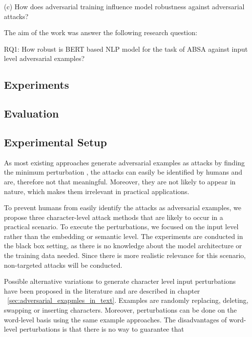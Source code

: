 (c) How does adversarial training influence model robustness against adversarial attacks?

The aim of the work was answer the following research question:

RQ1: How robust is BERT based NLP model for the task of ABSA against input level adversarial examples?



\subsection{Experiments}
\subsection{Evaluation}





\subsection{Experimental Setup} 


As most existing approaches generate adversarial examples as attacks by finding the minimum perturbation \cite{liang2017deep, ebrahimi2017hotflip, gao2018black, li2018textbugger, alzantot2018generating, jin2019bert, garg2020bae}, the attacks can easily be identified by humans and are, therefore not that meaningful. Moreover, they are not likely to appear in nature, which makes them irrelevant in practical applications. 

To prevent humans from easily identify the attacks as adversarial examples, we propose three character-level attack methods that are likely to occur in a practical scenario.
To execute the perturbations, we focused on the input level rather than the embedding or semantic level. The experiments are conducted in the black box setting, as there is no knowledge about the model architecture or the training data needed. Since there is more realistic relevance for this scenario, non-targeted attacks will be conducted.

Possible alternative variations to generate character level input perturbations have been proposed in the literature and are described in chapter ~\ref{sec:adversarial_exapmles_in_text}. Examples are randomly replacing, deleting, swapping or inserting characters. Moreover, perturbations can be done on the word-level basis using the same example approaches.  The disadvantages of word-level perturbations is that there is no way to guarantee that 

